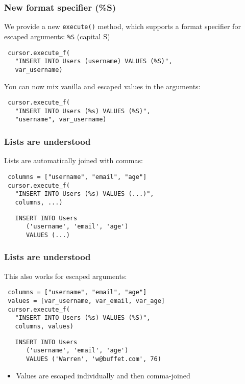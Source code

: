 \documentclass{beamer}
\begin{document}
\begin{frame}[fragile]
  \frametitle{New format specifier (\%S)}

  We provide a new \texttt{execute()} method, which supports a format specifier
  for escaped arguments: \texttt{\%S} (capital S)

\begin{verbatim}
 cursor.execute_f(
   "INSERT INTO Users (username) VALUES (%S)",
   var_username)
\end{verbatim}

  You can now mix vanilla and escaped values in the arguments:
\begin{verbatim}
 cursor.execute_f(
   "INSERT INTO Users (%s) VALUES (%S)",
   "username", var_username)
\end{verbatim}

\end{frame}



\begin{frame}[fragile]
  \frametitle{Lists are understood}

  Lists are automatically joined with commas:
\begin{verbatim}
 columns = ["username", "email", "age"]
 cursor.execute_f(
   "INSERT INTO Users (%s) VALUES (...)",
   columns, ...)
\end{verbatim}

\vfill
\begin{verbatim}
   INSERT INTO Users 
      ('username', 'email', 'age') 
      VALUES (...)
\end{verbatim}
\vfill

\end{frame}



\begin{frame}[fragile]
  \frametitle{Lists are understood}

  This also works for escaped arguments:
\begin{verbatim}
 columns = ["username", "email", "age"]
 values = [var_username, var_email, var_age]
 cursor.execute_f(
   "INSERT INTO Users (%s) VALUES (%S)",
   columns, values)
\end{verbatim}

\vfill
\begin{verbatim}
   INSERT INTO Users 
      ('username', 'email', 'age') 
      VALUES ('Warren', 'w@buffet.com', 76)
\end{verbatim}
\vfill

\begin{itemize}
\item Values are escaped individually and then comma-joined
\end{itemize}

\end{frame}
\end{document}

